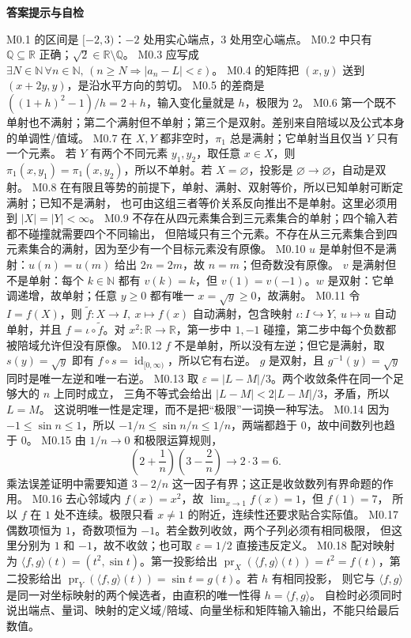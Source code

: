 \documentclass[UTF8,fontset=none,a4paper,11pt]{ctexart}
\theoremstyle{foundation-definition}
\theoremstyle{foundation-theorem}
\theoremstyle{foundation-proposition}
\theoremstyle{foundation-example}
\theoremstyle{foundation-remark}
\theoremstyle{foundation-theorem}
\newenvironment{answerkey}{%
\begin{mdframed}[backgroundcolor=examplebg,linecolor=examplepurple,linewidth=1.0pt,
  leftline=true,rightline=false,topline=false,bottomline=false,
  skipabove=7pt,skipbelow=8pt,innerleftmargin=10pt,innerrightmargin=8pt,
  innertopmargin=6pt,innerbottommargin=6pt]
{\sffamily\bfseries\color{examplepurple}答案提示与自检}\par\smallskip\small
}{\end{mdframed}}
\begin{document}
\begin{answerkey}
M0.1 的区间是 \([-2,3)\)：\(-2\) 处用实心端点，\(3\) 处用空心端点。
M0.2 中只有 \(\mathbb Q\subseteq\mathbb R\) 正确；\(\sqrt2\in\mathbb R\setminus\mathbb Q\)。
M0.3 应写成
\(\exists N\in\mathbb N\,\forall n\in\mathbb N,\,
(n\geq N\Rightarrow |a_n-L|<\varepsilon)\)。
M0.4 的矩阵把 \((x,y)\) 送到 \((x+2y,y)\)，是沿水平方向的剪切。
M0.5 的差商是 \(((1+h)^2-1)/h=2+h\)，输入变化量就是 \(h\)，极限为 \(2\)。
M0.6 第一个既不单射也不满射；第二个满射但不单射；第三个是双射。差别来自陪域以及公式本身的单调性/值域。
M0.7 在 \(X,Y\) 都非空时，\(\pi_1\) 总是满射；它单射当且仅当 \(Y\) 只有一个元素。
若 \(Y\) 有两个不同元素 \(y_1,y_2\)，取任意 \(x\in X\)，则
\(\pi_1(x,y_1)=\pi_1(x,y_2)\)，所以不单射。若 \(X=\varnothing\)，投影是
\(\varnothing\to\varnothing\)，自动是双射。
M0.8 在有限且等势的前提下，单射、满射、双射等价，所以已知单射可断定满射；已知不是满射，
也可由这组三者等价关系反向推出不是单射。这里必须用到 \(|X|=|Y|<\infty\)。
M0.9 不存在从四元素集合到三元素集合的单射；四个输入若都不碰撞就需要四个不同输出，
但陪域只有三个元素。不存在从三元素集合到四元素集合的满射，因为至少有一个目标元素没有原像。
M0.10 \(u\) 是单射但不是满射：\(u(n)=u(m)\) 给出 \(2n=2m\)，故 \(n=m\)；但奇数没有原像。
\(v\) 是满射但不是单射：每个 \(k\in\mathbb N\) 都有 \(v(k)=k\)，但
\(v(1)=v(-1)\)。\(w\) 是双射：它单调递增，故单射；任意 \(y\geq0\) 都有唯一
\(x=\sqrt y\geq0\)，故满射。
M0.11 令 \(I=f(X)\)，则
\(\widetilde f:X\to I,\ x\mapsto f(x)\) 自动满射，包含映射
\(\iota:I\hookrightarrow Y,\ u\mapsto u\) 自动单射，并且
\(f=\iota\circ\widetilde f\)。对 \(x^2:\mathbb R\to\mathbb R\)，第一步中
\(1,-1\) 碰撞，第二步中每个负数都被陪域允许但没有原像。
M0.12 \(f\) 不是单射，所以没有左逆；但它是满射，取
\(s(y)=\sqrt y\) 即有 \(f\circ s=\operatorname{id}_{[0,\infty)}\)，所以它有右逆。
\(g\) 是双射，且 \(g^{-1}(y)=\sqrt y\) 同时是唯一左逆和唯一右逆。
M0.13 取 \(\varepsilon=|L-M|/3\)。两个收敛条件在同一个足够大的 \(n\) 上同时成立，
三角不等式会给出 \(|L-M|<2|L-M|/3\)，矛盾，所以 \(L=M\)。
这说明唯一性是定理，而不是把“极限”一词换一种写法。
M0.14 因为 \(-1\le\sin n\le1\)，所以
\(-1/n\le\sin n/n\le1/n\)，两端都趋于 \(0\)，故中间数列也趋于 \(0\)。
M0.15 由 \(1/n\to0\) 和极限运算规则，
\[
\left(2+\frac1n\right)\left(3-\frac2n\right)\longrightarrow2\cdot3=6.
\]
乘法误差证明中需要知道 \(3-2/n\) 这一因子有界；这正是收敛数列有界命题的作用。
M0.16 去心邻域内 \(f(x)=x^2\)，故 \(\lim_{x\to1}f(x)=1\)，但 \(f(1)=7\)，
所以 \(f\) 在 \(1\) 处不连续。极限只看 \(x\ne1\) 的附近，连续性还要求贴合实际值。
M0.17 偶数项恒为 \(1\)，奇数项恒为 \(-1\)。若全数列收敛，两个子列必须有相同极限，
但这里分别为 \(1\) 和 \(-1\)，故不收敛；也可取 \(\varepsilon=1/2\) 直接违反定义。
M0.18 配对映射为
\(\langle f,g\rangle(t)=(t^2,\sin t)\)。第一投影给出
\(\operatorname{pr}_X(\langle f,g\rangle(t))=t^2=f(t)\)，第二投影给出
\(\operatorname{pr}_Y(\langle f,g\rangle(t))=\sin t=g(t)\)。若 \(h\) 有相同投影，
则它与 \(\langle f,g\rangle\) 是同一对坐标映射的两个候选者，由直积的唯一性得
\(h=\langle f,g\rangle\)。
自检时必须同时说出端点、量词、映射的定义域/陪域、向量坐标和矩阵输入输出，不能只给最后数值。
\end{answerkey}
\end{document}
